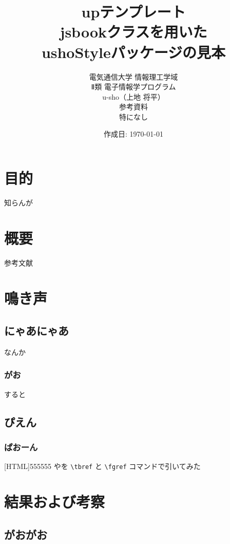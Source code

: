 \documentclass[uplatex,dvipdfmx,11pt]{jsbook}
\title{
  {\normalsize up\LaTeXe テンプレート}%
  \\[10truemm]
  jsbookクラスを用いた\\
  ushoStyleパッケージの見本
  \vspace{30truemm}
}
\author{
  \large{電気通信大学 情報理工学域}\\
  \large{Ⅱ類 電子情報学プログラム}
  \\[10truemm]
  u-sho（上地 将平）
  \\[20truemm]
  参考資料
  \\[5truemm]
  特になし
  \vspace{20truemm}
}
\date{作成日: \和暦\today}
\begin{document}
  \maketitle
  \tableofcontents

  \chapter{目的}%
    知らんが

  \chapter{概要}%
    参考文献~\cite{キー1}

  \chapter{鳴き声} %

    \section{にゃあにゃあ}
      なんか

      \subsection{がお}
        すると

    \section{ぴえん} %

      \subsection{ぱおーん}

        [HTML]{555555}{}
        やを \verb|\tbref| と \verb|\fgref| コマンドで引いてみた

  \newpage

  \chapter{結果および考察}

    \section{がおがお}
\end{document}
